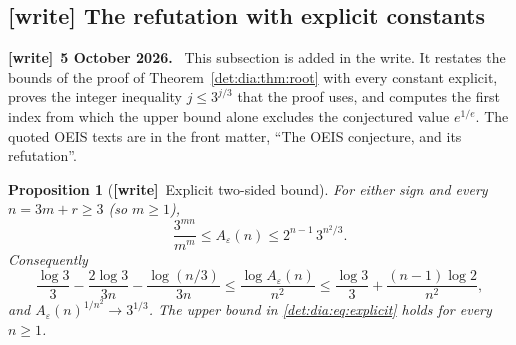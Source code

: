 \documentclass[11pt,letterpaper]{article}
\numberwithin{equation}{section}
\newtheorem{proposition}[theorem]{Proposition}
\theoremstyle{definition}\newtheorem{definition}[theorem]{Definition}
\theoremstyle{remark}\newtheorem{remark}[theorem]{Remark}
\newcommand{\eps}{\varepsilon}
\newenvironment{writenote}[1][]{\par\smallskip\begingroup\small
 \noindent\textbf{[write]}\if\relax\detokenize{#1}\relax\else~\textbf{#1.}\fi\ }%
 {\par\endgroup\smallskip}
\newcommand{\wtag}{\textup{\textbf{[write]}}}
\begin{document}
\subsection{\texorpdfstring{\wtag}{[write]} The refutation with explicit constants}\label{det:dia:sub:explicit}
\begin{writenote}[5 October 2026]
This subsection is added in the write. It restates the bounds of the proof of Theorem~\ref{det:dia:thm:root} with every constant explicit, proves the integer inequality $j\le3^{j/3}$ that the proof uses, and computes the first index from which the upper bound alone excludes the conjectured value $e^{1/e}$. The quoted OEIS texts are in the front matter, ``The OEIS conjecture, and its refutation''.
\end{writenote}

\begin{proposition}[\wtag\ Explicit two-sided bound]\label{det:dia:prop:explicit}
For either sign and every $n=3m+r\ge3$ (so $m\ge1$),
\begin{equation}\label{det:dia:eq:explicit}
 \frac{3^{mn}}{m^m}\le A_\eps(n)\le2^{n-1}\,3^{n^2/3}.
\end{equation}
Consequently
\begin{equation}\label{det:dia:eq:explicitlog}
 \frac{\log3}{3}-\frac{2\log3}{3n}-\frac{\log(n/3)}{3n}
 \le\frac{\log A_\eps(n)}{n^2}
 \le\frac{\log3}{3}+\frac{(n-1)\log2}{n^2},
\end{equation}
and $A_\eps(n)^{1/n^2}\to3^{1/3}$. The upper bound in \eqref{det:dia:eq:explicit} holds for every $n\ge1$.
\end{proposition}
\end{document}
